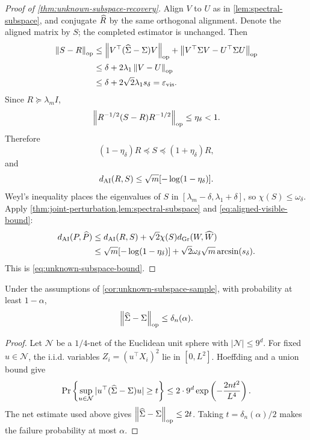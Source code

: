\begin{proof}[Proof of \cref{thm:unknown-subspace-recovery}]
Align \(V\) to \(U\) as in \cref{lem:spectral-subspace}, and conjugate
\(\widehat R\) by the same orthogonal alignment.  Denote the aligned matrix by
\(S\); the completed estimator is unchanged.  Then
\begin{align*}
  \left\lVert S-R\right\rVert_{\operatorname{op}}
  &\le\left\lVert V^\top(\widehat\Sigma-\Sigma)V\right\rVert_{\operatorname{op}}
  +\left\lVert V^\top\Sigma V-U^\top\Sigma U\right\rVert_{\operatorname{op}}\\
  &\le\delta+2\lambda_1\left\lVert V-U\right\rVert_{\operatorname{op}}\\
  &\le\delta+2\sqrt2\lambda_1s_\delta
  =\varepsilon_{\mathrm{vis}}.
\end{align*}
Since \(R\succeq\lambda_mI\),
\[
  \left\lVert R^{-1/2}(S-R)R^{-1/2}\right\rVert_{\operatorname{op}}
  \le\eta_\delta<1.
\]
Therefore
\[
  (1-\eta_\delta)R\preceq S\preceq(1+\eta_\delta)R,
\]
and
\begin{equation}
  d_{\mathrm{AI}}(R,S)\le\sqrt m[-\log(1-\eta_\delta)].
  \label{eq:aligned-visible-bound}
\end{equation}
Weyl's inequality places the eigenvalues of \(S\) in
\([\lambda_m-\delta,\lambda_1+\delta]\), so
\(\chi(S)\le\omega_\delta\).  Apply
\cref{thm:joint-perturbation,lem:spectral-subspace} and
\eqref{eq:aligned-visible-bound}:
\begin{align*}
  d_{\mathrm{AI}}(P,\widehat P)
  &\le d_{\mathrm{AI}}(R,S)+\sqrt2\chi(S)d_{\mathrm{Gr}}(W,\widehat W)\\
  &\le\sqrt m[-\log(1-\eta_\delta)]
  +\sqrt2\omega_\delta\sqrt m\arcsin(s_\delta).
\end{align*}
This is \eqref{eq:unknown-subspace-bound}.
\end{proof}

\begin{lemma}
\label{lem:ambient-concentration}
Under the assumptions of \cref{cor:unknown-subspace-sample}, with probability
at least \(1-\alpha\),
\[
  \left\lVert \widehat\Sigma-\Sigma\right\rVert_{\operatorname{op}}\le\delta_n(\alpha).
\]
\end{lemma}

\begin{proof}
Let \(\mathcal N\) be a \(1/4\)-net of the Euclidean unit sphere with
\(|\mathcal N|\le9^d\).  For fixed \(u\in\mathcal N\), the i.i.d. variables
\(Z_i=(u^\top X_i)^2\) lie in \([0,L^2]\).  Hoeffding and a union bound give
\[
  \Pr\left\{
  \sup_{u\in\mathcal N}|u^\top(\widehat\Sigma-\Sigma)u|\ge t
  \right\}
  \le2\cdot9^d\exp\left(-\frac{2nt^2}{L^4}\right).
\]
The net estimate used above gives
\(\left\lVert \widehat\Sigma-\Sigma\right\rVert_{\operatorname{op}}\le2t\).  Taking
\(t=\delta_n(\alpha)/2\) makes the failure probability at most \(\alpha\).
\end{proof}


